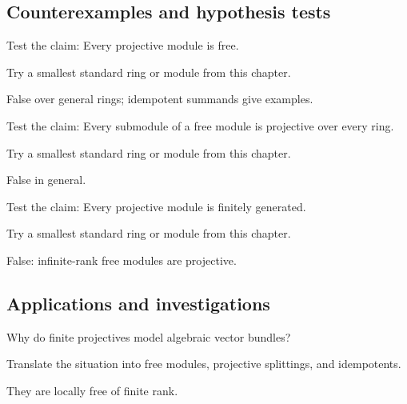 \subsection*{Counterexamples and hypothesis tests}

\begin{exercise}\label{exr:v13-expand-10}
Test the claim: Every projective module is free.
\end{exercise}
\begin{hint}
Try a smallest standard ring or module from this chapter.
\end{hint}
\begin{solution}
False over general rings; idempotent summands give examples.
\end{solution}

\begin{exercise}\label{exr:v13-expand-11}
Test the claim: Every submodule of a free module is projective over every ring.
\end{exercise}
\begin{hint}
Try a smallest standard ring or module from this chapter.
\end{hint}
\begin{solution}
False in general.
\end{solution}

\begin{exercise}\label{exr:v13-expand-12}
Test the claim: Every projective module is finitely generated.
\end{exercise}
\begin{hint}
Try a smallest standard ring or module from this chapter.
\end{hint}
\begin{solution}
False: infinite-rank free modules are projective.
\end{solution}

\subsection*{Applications and investigations}

\begin{exercise}\label{exr:v13-expand-13}
Why do finite projectives model algebraic vector bundles?
\end{exercise}
\begin{hint}
Translate the situation into free modules, projective splittings, and idempotents.
\end{hint}
\begin{solution}
They are locally free of finite rank.
\end{solution}

